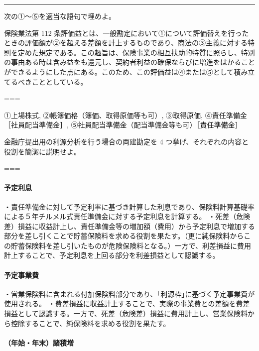 \documentclass[report,gutter=10mm,fore-edge=10mm,uplatex,dvipdfmx]{jlreq}
\begin{document}
\begin{center}\rule{0.5\linewidth}{0.5pt}\end{center}


次の①～⑤を適当な語句で埋めよ。

保険業法第 112
条評価益とは、一般勘定において①について評価替えを行ったときの評価額が②を超える差額を計上するものであり、商法の③主義に対する特則を定めた規定である。この趣旨は、保険事業の相互扶助的特質に照らし、特別の事由ある時は含み益をも還元し、契約者利益の確保ならびに増進をはかることができるようにした点にある。このため、この評価益は④または⑤として積み立てるべきこととしている。

===


①上場株式, ②帳簿価格（簿価、取得原価等も可）, ③取得原価, ④責任準備金
［社員配当準備金］, ⑤社員配当準備金（配当準備金等も可）［責任準備金］


金融庁提出用の利源分析を行う場合の両建勘定を 4
つ挙げ、それぞれの内容と役割を簡潔に説明せよ。

===


\paragraph{予定利息}

・責任準備金に対して予定利率に基づき計算した利息であり、保険料計算基礎率による５年チルメル式責任準備金に対する予定利息を計算する。
・死差（危険差）損益に収益計上し、責任準備金等の増加額（費用）から予定利息で増加する部分を差し引くことで貯蓄保険料を求める役割を果たす。（更に純保険料からこの貯蓄保険料を差し引いたものが危険保険料となる。）一方で、利差損益に費用計上することで、予定利息を上回る部分を利差損益として認識する。

\paragraph{予定事業費}

・営業保険料に含まれる付加保険料部分であり、｢利源枠｣に基づく予定事業費が使用される。
・費差損益に収益計上することで、実際の事業費との差額を費差損益として認識する。一方で、死差（危険差）損益に費用計上し、営業保険料から控除することで、純保険料を求める役割を果たす。

\paragraph{（年始・年末）諸積増}
\end{document}
